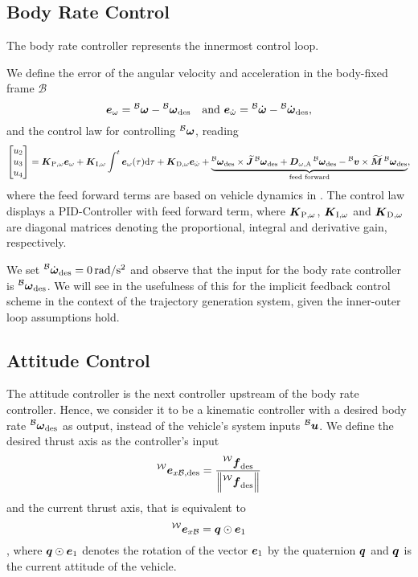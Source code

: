 \subsection{Body Rate Control}
The body rate controller represents the innermost control loop.

We define the error of the angular velocity and acceleration in the body-fixed frame $\mathcal{B}$
\begin{equation}
	\vangerror = \vangbody - \vangdesiredbody \quad \text{and }
	\aangerror = \aangbody - \aangdesiredbody
	,
\end{equation}
and the control law for controlling $\prescript{\mathcal{B}}{}{\mbox{$\bm{\omega}$}}$, reading
\begin{equation}
	\begin{bmatrix}
		u_2 \\ u_3 \\ u_4
	\end{bmatrix}
	=
	\KpBodyRate \vangerror
	+ \KiBodyRate \int_{}^{t} \vangerror(\tau)\text{d}\tau
	+ \KdBodyRate \aangerror
	+\underbrace{
		\vangdesiredbody \times \Jbs \vangdesiredbody
		+ \Domegaadded \vangdesiredbody
		- \vlinbody \times \Mbs \vangdesiredbody
	}_{\text{feed forward}}
	,
\end{equation}
where the feed forward terms are based on vehicle dynamics in . The control law displays a PID-Controller with feed forward term, where $\mbox{$\bm{K}$}_{\text{P},\omega}$, $\mbox{$\bm{K}$}_{\text{I},\omega}$ and $\mbox{$\bm{K}$}_{\text{D},\omega}$ are diagonal matrices denoting the proportional, integral and derivative gain, respectively.

We set $\aangdesiredbody = \unit[0]{rad/s^2}$ and observe that the input for the body rate controller is $\vangdesiredbody$. We will see in  the usefulness of this for the implicit feedback control scheme in the context of the trajectory generation system, given the inner-outer loop assumptions hold.

\subsection{Attitude Control}
The attitude controller is the next controller upstream of the body rate controller. Hence, we consider it to be a kinematic controller with a desired body rate $\vangdesiredbody$ as output, instead of the vehicle's system inputs $\prescript{\mathcal{B}}{}{\mbox{$\bm{u}$}}$. We define the desired thrust axis as the controller's input 
\begin{equation}
	\exdesiredbodyinworld =
	\frac{\thrustdesiredworld}{
		\left\lVert\thrustdesiredworld\right\rVert
	}
\end{equation}
and the current thrust axis, that is equivalent to 
\begin{equation}
	\prescript{\mathcal{W}}{}{\mbox{$\bm{e}$}}_{x\mathcal{B}} = \mbox{$\bm{q}$} \odot \mbox{$\bm{e}$}_1
\end{equation},
where $\mbox{$\bm{q}$} \odot \mbox{$\bm{e}$}_1$ denotes the rotation of the vector $\mbox{$\bm{e}$}_1$ by the quaternion $\mbox{$\bm{q}$}$ and $\mbox{$\bm{q}$}$ is the current attitude of the vehicle.

